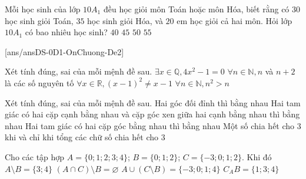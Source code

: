 %
\begin{ex}%
	Mỗi học sinh của lớp $10A_1$ đều học giỏi môn Toán hoặc môn Hóa, biết rằng có $30$ học sinh giỏi Toán, $35$ học sinh giỏi Hóa, và $20$ em học giỏi cả hai môn. Hỏi lớp $10A_1$ có bao nhiêu học sinh?
	\choice
	{$40$}
	{\True $45$}
	{$50$}
	{$55$}
\end{ex}

\TNTF
\setcounter{ex}{0}
[ans/ansDS-0D1-OnChuong-De2]
%
\begin{ex}%
	Xét tính đúng, sai của mỗi mệnh đề sau.
	\choiceTF
	{\True $\exists x\in\mathbb{Q}, 4 x^2-1=0$}
	{$\forall n\in\mathbb{N}, n$ và $n+2$ là các số nguyên tố}
	{$\forall x\in\mathbb{R},(x-1)^2\neq x-1$}
	{$\forall n\in\mathbb{N}, n^2>n$}
\end{ex}
%
\begin{ex}%
	Xét tính đúng, sai của mỗi mệnh đề sau.
	\choiceTF
	{\True Hai góc đối đỉnh thì bằng nhau}
	{\True Hai tam giác có hai cặp cạnh bằng nhau và cặp góc xen giữa hai cạnh bằng nhau thì bằng nhau}
	{Hai tam giác có hai cặp góc bằng nhau thì bằng nhau}
	{\True Một số chia hết cho $3$ khi và chỉ khi tổng các chữ số chia hết cho $3$}
\end{ex}
%
\begin{ex}%
	Cho các tập hợp $A=\{0 ; 1 ; 2 ; 3 ; 4\}$; $ B=\{0 ; 1 ; 2\}$; $C=\{-3 ; 0 ; 1 ; 2\}$. Khi đó
	\choiceTF
	{\True $A\setminus B=\{3 ; 4\}$}
	{\True $(A\cap C)\setminus B=\varnothing$}
	{$A\cup (C\setminus B)=\{-3;0;1;4\}$}
	{$C_AB=\{1;3;4\}$}
\end{ex}

